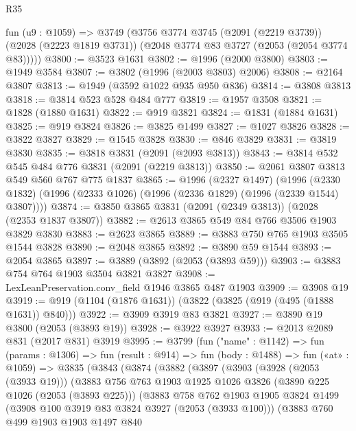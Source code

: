 \begin{lexlean}{R35}
\begin{coremodule}
    fun (u9 : @1059) =>
    @3749
      (@3756
        @3774
        @3745
        (@2091 (@2219 @3739))
        (@2028 (@2223 @1819 @3731))
        (@2048 @3774 @83 @3727 (@2053 (@2054 @3774 @83)))))
@3800 := @3523 @1631
@3802 := @1996 (@2000 @3800)
@3803 := @1949 @3584
@3807 := @3802 (@1996 (@2003 @3803) @2006)
@3808 := @2164 @3807
@3813 := @1949 (@3592 @1022 @935 @950 @836)
@3814 := @3808 @3813
@3818 := @3814 @523 @528 @484 @777
@3819 := @1957 @3508
@3821 := @1828 (@1880 @1631)
@3822 := @919 @3821
@3824 := @1831 (@1884 @1631)
@3825 := @919 @3824
@3826 := @3825 @1499
@3827 := @1027 @3826
@3828 := @3822 @3827
@3829 := @1545 @3828
@3830 := @846 @3829
@3831 := @3819 @3830
@3835 := @3818 @3831 (@2091 (@2093 @3813))
@3843 := @3814 @532 @545 @484 @776 @3831 (@2091 (@2219 @3813))
@3850 := @2061 @3807 @3813 @549 @560 @767 @775 @1837
@3865 := @1996
    (@2327 @1497)
    (@1996 (@2330 @1832) (@1996 (@2333 @1026) (@1996 (@2336 @1829) (@1996 (@2339 @1544) @3807))))
@3874 := @3850 @3865 @3831 (@2091 (@2349 @3813)) (@2028 (@2353 @1837 @3807))
@3882 := @2613 @3865 @549 @84 @766 @3506 @1903 @3829 @3830
@3883 := @2623 @3865
@3889 := @3883 @750 @765 @1903 @3505 @1544 @3828
@3890 := @2048 @3865
@3892 := @3890 @59 @1544
@3893 := @2054 @3865
@3897 := @3889 (@3892 (@2053 (@3893 @59)))
@3903 := @3883 @754 @764 @1903 @3504 @3821 @3827
@3908 := LexLeanPreservation.conv_field @1946 @3865 @487 @1903
@3909 := @3908 @19
@3919 := @919 (@1104 (@1876 @1631)) (@3822 (@3825 (@919 (@495 (@1888 @1631)) @840)))
@3922 := @3909 @3919 @83 @3821
@3927 := @3890 @19 @3800 (@2053 (@3893 @19))
@3928 := @3922 @3927
@3933 := @2013 @2089 @831 (@2017 @831) @3919
@3995 := @3799
    (fun ("name" : @1142) =>
    fun (params : @1306) =>
    fun (result : @914) =>
    fun (body : @1488) =>
    fun («at» : @1059) =>
    @3835
      (@3843
        (@3874
          (@3882
            (@3897
              (@3903
                (@3928 (@2053 (@3933 @19)))
                (@3883
                  @756
                  @763
                  @1903
                  @1925
                  @1026
                  @3826
                  (@3890 @225 @1026 (@2053 (@3893 @225)))
                  (@3883
                    @758
                    @762
                    @1903
                    @1905
                    @3824
                    @1499
                    (@3908 @100 @3919 @83 @3824 @3927 (@2053 (@3933 @100)))
                    (@3883
                      @760
                      @499
                      @1903
                      @1903
                      @1497
                      @840

\end{coremodule}
\end{lexlean}
